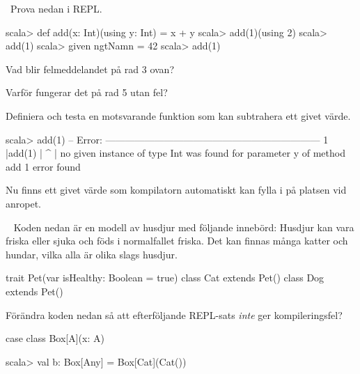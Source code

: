 \QUESTEND


\ExtraTasks



\QUESTBEGIN

\Task  \what~Prova nedan i REPL.
\begin{REPL}
scala> def add(x: Int)(using y: Int) = x + y
scala> add(1)(using 2)
scala> add(1)
scala> given ngtNamn = 42
scala> add(1)
\end{REPL}
\Subtask Vad blir felmeddelandet på rad 3 ovan? 

\Subtask Varför fungerar det på rad 5 utan fel?

\Subtask Definiera och testa en motsvarande funktion  som kan subtrahera ett givet värde.

\SOLUTION


\TaskSolved \what

\SubtaskSolved 
\begin{REPL}
scala> add(1)
-- Error: ------------------------------------------------------------------
1 |add(1)
  |      ^
  |    no given instance of type Int was found for parameter y of method add
1 error found
\end{REPL}

\SubtaskSolved Nu finns ett givet värde som kompilatorn automatiskt kan fylla i på platsen vid anropet.

\SubtaskSolved {}

\QUESTEND

\AdvancedTasks %



\QUESTBEGIN

\Task  \what~ Koden nedan är en modell av husdjur med följande innebörd: Husdjur kan vara friska eller sjuka och föds i normalfallet friska. Det kan finnas många katter och hundar, vilka alla är olika slags husdjur.

\begin{Code}
trait Pet(var isHealthy: Boolean = true)
class Cat extends Pet()
class Dog extends Pet()

\end{Code}

\Subtask Förändra koden nedan så att efterföljande REPL-sats \emph{inte} ger kompileringsfel?
\begin{Code}
case class Box[A](x: A)
\end{Code}
\begin{REPLnonum}
scala> val b: Box[Any] = Box[Cat](Cat())
\end{REPLnonum}

